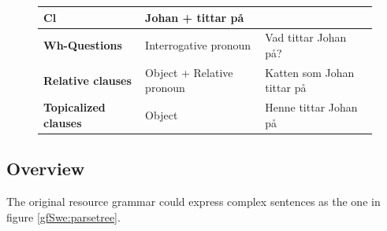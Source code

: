 \documentclass{report}
\begin{document}
\begin{figure}[h]
\begin{tabular}{|l|ll|}
\hline
\textbf{Cl}& Johan + tittar på \\
\hline
\textbf{Wh-Questions} & Interrogative pronoun   & Vad tittar Johan på?\\
\textbf{Relative clauses} & Object + Relative pronoun & Katten som Johan tittar på \\
\textbf{Topicalized clauses} & Object  & Henne tittar Johan på \\
\hline
\end{tabular}
\caption{}
\label{fig:clause2}
\end{figure}


%
%


\subsection{Overview}
\vspace{4mm}
The original resource grammar could express complex sentences
as the one in figure \ref{gfSwe:parsetree}.
\end{document}
